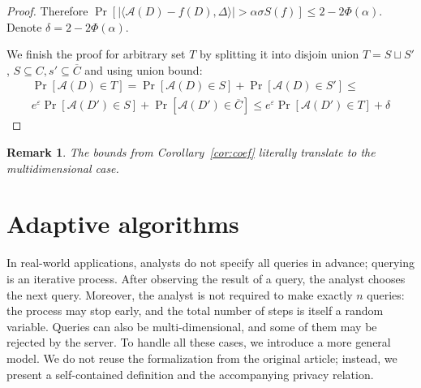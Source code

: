\documentclass[12pt,letterpaper]{article}
\let\eps\varepsilon
\newtheorem{remark}{Remark}
\begin{document}
\begin{proof}
Therefore $\Pr[|\langle \mathcal{A}(D) - f(D), \Delta\rangle| > \alpha\sigma S(f)] \leq 2 - 2\Phi(\alpha)$. Denote $\delta = 2 - 2\Phi(\alpha)$. 

We finish the proof for arbitrary set $T$ by splitting it into disjoin union $T = S \sqcup S'$, $S \subseteq C, s' \subseteq \overline{C}$ and using union bound:
\begin{multline*}
  \Pr[\mathcal{A}(D) \in T] = \Pr[\mathcal{A}(D) \in S] + \Pr[\mathcal{A}(D) \in S'] \leq \\
  e^\eps\Pr[\mathcal{A}(D') \in S] + \Pr[\mathcal{A}(D') \in \overline{C}] \leq e^\eps \Pr[\mathcal{A}(D') \in T] + \delta
\end{multline*}
\end{proof}

\begin{remark}
  The bounds from Corollary~\ref{cor:coef} literally translate to the multidimensional case.
\end{remark}

\section{Adaptive algorithms}

In real-world applications, analysts do not specify all queries in advance; querying is an iterative process. After observing the result of a query, the analyst chooses the next query. Moreover, the analyst is not required to make exactly $n$ queries: the process may stop early, and the total number of steps is itself a random variable. Queries can also be multi-dimensional, and some of them may be rejected by the server. To handle all these cases, we introduce a more general model. We do not reuse the formalization from the original article; instead, we present a self-contained definition and the accompanying privacy relation.
\end{document}
